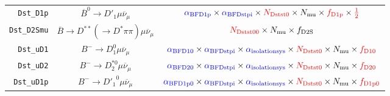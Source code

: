 \begin{landscape}
\begin{table}
\begin{tabular}{r|c|c}
     \texttt{Dst\_D1p} &             $\overline{B}^0 \rightarrow D'_1 \mu \overline{\nu}_\mu$              &                                                                                 $\textcolor{blue}{\alpha_\text{BFD1p}} \times \textcolor{blue}{\alpha_\text{BFDstpi}} \times \textcolor{red}{N_\text{Dstst0}} \times N_\text{mu} \times \textcolor{red}{f_\text{D1p}} \times \textcolor{red}{\frac{1}{2}}$                                                                                 \\
   \texttt{Dst\_D2Smu} & $\overline{B} \rightarrow D^{**} (\rightarrow D^* \pi\pi) \mu \overline{\nu}_\mu$ &                                                                                                                                                         $\textcolor{red}{N_\text{Dstst00}} \times N_\text{mu} \times f_\text{D2S}$                                                                                                                                                         \\
     \texttt{Dst\_uD1} &                  $B^- \rightarrow D_1^0 \mu \overline{\nu}_\mu$                   &                                                                         $\textcolor{blue}{\alpha_\text{BFD10}} \times \textcolor{blue}{\alpha_\text{BFDstpi}} \times \textcolor{blue}{\alpha_\text{isolationsys}} \times \textcolor{red}{N_\text{Dstst0}} \times N_\text{mu} \times \textcolor{red}{f_\text{D10}}$                                                                         \\
     \texttt{Dst\_uD2} &                 $B^- \rightarrow D_2^{*0} \mu \overline{\nu}_\mu$                 &                                                                         $\textcolor{blue}{\alpha_\text{BFD20}} \times \textcolor{blue}{\alpha_\text{BFDstpi}} \times \textcolor{blue}{\alpha_\text{isolationsys}} \times \textcolor{red}{N_\text{Dstst0}} \times N_\text{mu} \times \textcolor{red}{f_\text{D20}}$                                                                         \\
    \texttt{Dst\_uD1p} &                 $B^- \rightarrow {D'_1}^0 \mu \overline{\nu}_\mu$                 &                                                                        $\textcolor{blue}{\alpha_\text{BFD1p0}} \times \textcolor{blue}{\alpha_\text{BFDstpi}} \times \textcolor{blue}{\alpha_\text{isolationsys}} \times \textcolor{red}{N_\text{Dstst0}} \times N_\text{mu} \times \textcolor{red}{f_\text{D1p0}}$                                                                        \\

\end{tabular}
\end{table}
\end{landscape}
